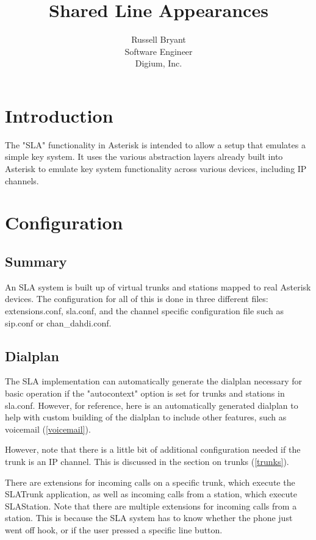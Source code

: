 \documentclass[12pt,a4]{article}
\author{Russell Bryant \\ Software Engineer \\  Digium, Inc.}
\title{Shared Line Appearances}
\begin{document}
\maketitle

\tableofcontents

\section{Introduction}

The "SLA" functionality in Asterisk is intended to allow a setup that emulates
a simple key system.  It uses the various abstraction layers already built into
Asterisk to emulate key system functionality across various devices, including
IP channels.

\section{Configuration}

\subsection{Summary}

An SLA system is built up of virtual trunks and stations mapped to real
Asterisk devices.  The configuration for all of this is done in three
different files: extensions.conf, sla.conf, and the channel specific
configuration file such as sip.conf or chan_dahdi.conf.

\subsection{Dialplan}

The SLA implementation can automatically generate the dialplan necessary for
basic operation if the "autocontext" option is set for trunks and stations in
sla.conf.  However, for reference, here is an automatically generated dialplan
to help with custom building of the dialplan to include other features, such as
voicemail (\ref{voicemail}).

However, note that there is a little bit of additional configuration needed if
the trunk is an IP channel.  This is discussed in the section on trunks (\ref{trunks}).

There are extensions for incoming calls on a specific trunk, which execute the SLATrunk
application, as well as incoming calls from a station, which execute SLAStation.
Note that there are multiple extensions for incoming calls from a station.  This is
because the SLA system has to know whether the phone just went off hook, or if the
user pressed a specific line button.
\end{document}
